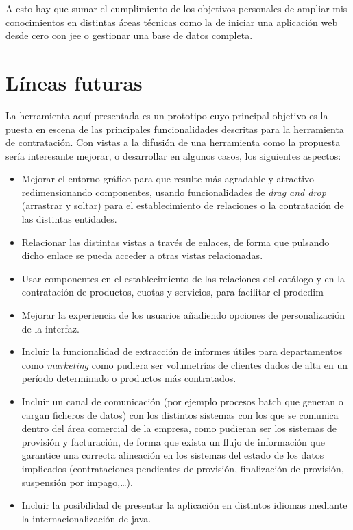 A esto hay que sumar el cumplimiento de los objetivos personales de ampliar mis conocimientos en distintas áreas técnicas como la de iniciar una aplicación web desde cero con \acrshort{jee} o gestionar una base de datos completa.



\section{Líneas futuras}
\label{sec:futuro}

La herramienta aquí presentada es un prototipo cuyo principal objetivo es la puesta en escena de las principales funcionalidades descritas para la herramienta de contratación. Con vistas a la difusión de una herramienta como la propuesta sería interesante mejorar, o desarrollar en algunos casos, los siguientes aspectos:
\begin{itemize}
\item Mejorar el entorno gráfico para que resulte más agradable y atractivo redimensionando componentes, usando funcionalidades de \textit{drag and drop} (arrastrar y soltar) para el establecimiento de relaciones o la contratación de las distintas entidades.
\item Relacionar las distintas vistas a través de enlaces, de forma que pulsando dicho enlace se pueda acceder a otras vistas relacionadas.
\item Usar componentes en el establecimiento de las relaciones del catálogo y en la contratación de productos, cuotas y servicios, para facilitar el prodedim
\item Mejorar la experiencia de los usuarios añadiendo opciones de personalización de la interfaz.
\item Incluir la funcionalidad de extracción de informes útiles para departamentos como \emph{marketing} como pudiera ser volumetrías de clientes dados de alta en un período determinado o productos más contratados.
\item Incluir un canal de comunicación (por ejemplo procesos batch que generan o cargan ficheros de datos) con los distintos sistemas con los que se comunica dentro del área comercial de la empresa, como pudieran ser los sistemas de provisión y facturación, de forma que exista un flujo de información que garantice una correcta alineación en los sistemas del estado de los datos implicados (contrataciones pendientes de provisión, finalización de provisión, suspensión por impago,\dots).
\item Incluir la posibilidad de presentar la aplicación en distintos idiomas mediante la internacionalización de java.
\end{itemize}
